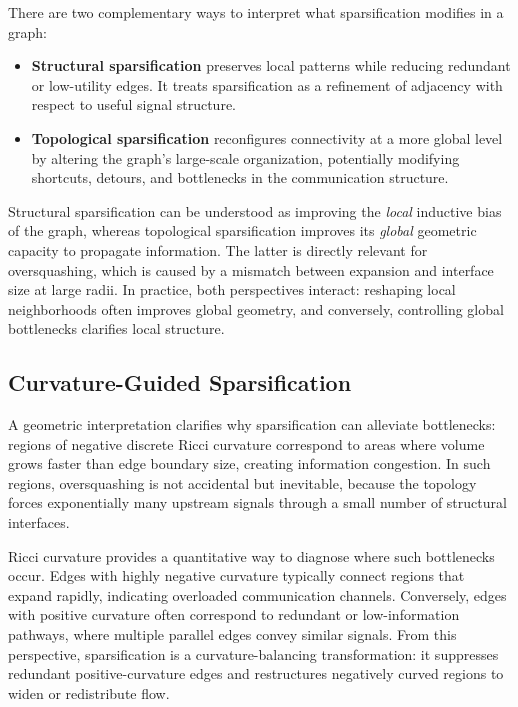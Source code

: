 \documentclass[letterpaper,12pt]{article}
\begin{document}
There are two complementary ways to interpret what sparsification modifies in a graph:

\begin{itemize}
    \item \textbf{Structural sparsification} preserves local patterns while reducing redundant or low-utility edges. It treats sparsification as a refinement of adjacency with respect to useful signal structure.
    \item \textbf{Topological sparsification} reconfigures connectivity at a more global level by altering the graph's large-scale organization, potentially modifying shortcuts, detours, and bottlenecks in the communication structure.
\end{itemize}

Structural sparsification can be understood as improving the \emph{local} inductive bias of the graph, whereas topological sparsification improves its \emph{global} geometric capacity to propagate information. The latter is directly relevant for oversquashing, which is caused by a mismatch between expansion and interface size at large radii. In practice, both perspectives interact: reshaping local neighborhoods often improves global geometry, and conversely, controlling global bottlenecks clarifies local structure.

\subsection{Curvature-Guided Sparsification}

A geometric interpretation clarifies why sparsification can alleviate bottlenecks: regions of negative discrete Ricci curvature correspond to areas where volume grows faster than edge boundary size, creating information congestion. In such regions, oversquashing is not accidental but inevitable, because the topology forces exponentially many upstream signals through a small number of structural interfaces.

Ricci curvature provides a quantitative way to diagnose where such bottlenecks occur. Edges with highly negative curvature typically connect regions that expand rapidly, indicating overloaded communication channels. Conversely, edges with positive curvature often correspond to redundant or low-information pathways, where multiple parallel edges convey similar signals. From this perspective, sparsification is a curvature-balancing transformation: it suppresses redundant positive-curvature edges and restructures negatively curved regions to widen or redistribute flow.
\end{document}
